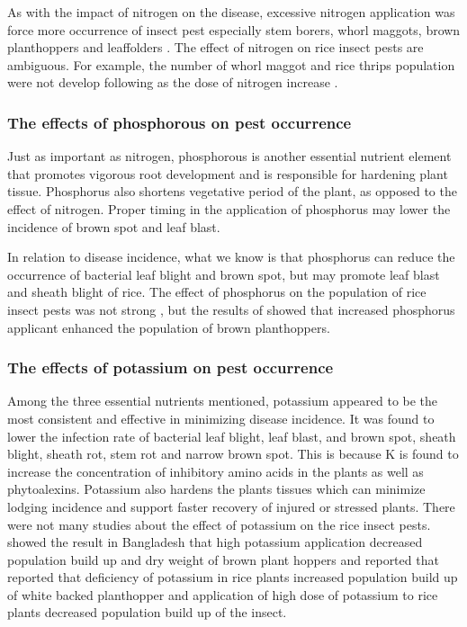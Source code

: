 \documentclass[12pt, oneside]{report}
\begin{document}
As with the impact of nitrogen on the disease, excessive nitrogen application was force more occurrence of insect pest especially stem borers, whorl maggots, brown planthoppers and leaffolders \citep{chau2003impacts, litsinger2011cultural, rashid2014effect}. The effect of nitrogen on rice insect pests are ambiguous. For example, the number of whorl maggot and rice thrips population were not develop following as the dose of nitrogen increase \citep{chau2003impacts}.

\subsubsection{The effects of phosphorous on pest occurrence}

Just as important as nitrogen, phosphorous is another essential nutrient element that promotes vigorous root development and is responsible for hardening plant tissue. Phosphorus also shortens vegetative period of the plant, as opposed to the effect of nitrogen. Proper timing in the application of phosphorus may lower the incidence of brown spot and leaf blast.

In relation to disease incidence, what we know is that phosphorus can reduce the occurrence of bacterial leaf blight and brown spot, but may promote leaf blast and sheath blight of rice. The effect of phosphorus on the population of rice insect pests was not strong \citep{chau2003impacts, rashid2014effect}, but the results of \cite{rashid2014effect} showed that increased phosphorus applicant enhanced the population of brown planthoppers.

\subsubsection{The effects of potassium on pest occurrence}

Among the three essential nutrients mentioned, potassium appeared to be the most consistent and effective in minimizing disease incidence. It was found to lower the infection rate of bacterial leaf blight, leaf blast, and brown spot, sheath blight, sheath rot, stem rot and narrow brown spot. This is because K is found to increase the concentration of inhibitory amino acids in the plants as well as phytoalexins. Potassium also hardens the plants tissues which can minimize lodging incidence and support faster recovery of injured or stressed plants. There were not many studies about the effect of potassium on the rice insect pests. \cite{rashid2014effect} showed the result in Bangladesh that high potassium application decreased population build up and dry weight of brown plant hoppers and \cite{salim2002effects} reported that reported that deficiency of potassium in rice plants increased population build up of white backed planthopper and application of high dose of potassium to rice plants decreased population build up of the insect.
\end{document}
